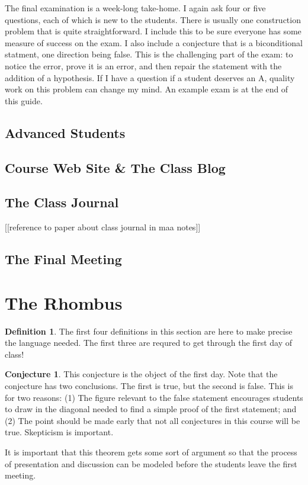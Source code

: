 \documentclass{tufte-handout}
\theoremstyle{definition}
\newtheorem{conjecture}[problem]{Conjecture}
\newtheorem*{definition}{Definition}
\begin{document}
The final examination is a week-long take-home.
I again ask four or five questions, each of which is new to the students.
There is usually one construction problem that is quite straightforward.
I include this to be sure everyone has some measure of success on the exam.
I also include a conjecture that is a biconditional statment, one direction being false.
This is the challenging part of the exam: to notice the error, prove it is an error, and then repair the statement with the addition of a hypothesis.
If I have a question if a student deserves an A, quality work on this problem can change my mind.
An example exam is at the end of this guide.

\subsection{Advanced Students}

\subsection{Course Web Site \& The Class Blog}


\subsection{The Class Journal}

[[reference to paper about class journal in maa notes]]


\subsection{The Final Meeting}

\clearpage
\setcounter{section}{1}
\section{The Rhombus}

\begin{definition}
The first four definitions in this section are here to make precise the language needed. The first three are requred to get through the first day of class! 
\end{definition}

\begin{conjecture}
This conjecture is the object of the first day.
Note that the conjecture has two conclusions.
The first is true, but the second is false.
This is for two reasons:
(1) The figure relevant to the false statement encourages students to draw in the diagonal needed to find a simple proof of the first statement; and
(2) The point should be made early that not all conjectures in this course will be true.
Skepticism is important.

It is important that this theorem gets some sort of argument so that the process of presentation and discussion can be modeled before the students leave the first meeting.\\
\end{conjecture}
\end{document}
